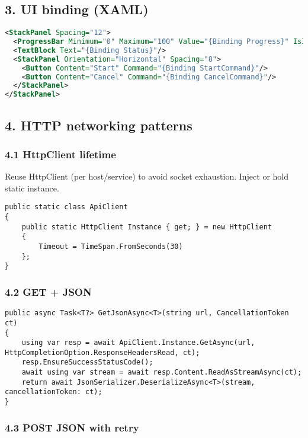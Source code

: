 \subsection{3. UI binding (XAML)}\label{ui-binding-xaml}

\begin{lstlisting}[language=XML]
<StackPanel Spacing="12">
  <ProgressBar Minimum="0" Maximum="100" Value="{Binding Progress}" IsIndeterminate="{Binding IsBusy}"/>
  <TextBlock Text="{Binding Status}"/>
  <StackPanel Orientation="Horizontal" Spacing="8">
    <Button Content="Start" Command="{Binding StartCommand}"/>
    <Button Content="Cancel" Command="{Binding CancelCommand}"/>
  </StackPanel>
</StackPanel>
\end{lstlisting}

\subsection{4. HTTP networking patterns}\label{http-networking-patterns}

\subsubsection{4.1 HttpClient lifetime}\label{httpclient-lifetime}

Reuse HttpClient (per host/service) to avoid socket exhaustion. Inject
or hold static instance.

\begin{lstlisting}
public static class ApiClient
{
    public static HttpClient Instance { get; } = new HttpClient
    {
        Timeout = TimeSpan.FromSeconds(30)
    };
}
\end{lstlisting}

\subsubsection{4.2 GET + JSON}\label{get-json}

\begin{lstlisting}
public async Task<T?> GetJsonAsync<T>(string url, CancellationToken ct)
{
    using var resp = await ApiClient.Instance.GetAsync(url, HttpCompletionOption.ResponseHeadersRead, ct);
    resp.EnsureSuccessStatusCode();
    await using var stream = await resp.Content.ReadAsStreamAsync(ct);
    return await JsonSerializer.DeserializeAsync<T>(stream, cancellationToken: ct);
}
\end{lstlisting}

\subsubsection{4.3 POST JSON with retry}\label{post-json-with-retry}

